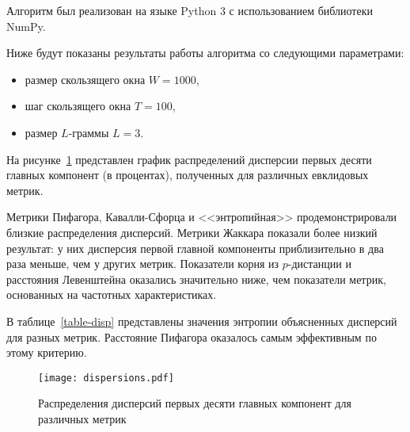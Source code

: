 Алгоритм был реализован на языке Python 3 с использованием библиотеки NumPy.

Ниже будут показаны результаты работы алгоритма со следующими параметрами:
\begin{itemize}
  \item размер скользящего окна $W = 1000$,
  \item шаг скользящего окна $T = 100$,
  \item размер $L$-граммы $L = 3$.
\end{itemize}

На рисунке~\ref{dispersions} представлен график распределений дисперсии первых десяти главных компонент (в процентах), полученных для различных евклидовых метрик.

Метрики Пифагора, Кавалли-Сфорца и <<энтропийная>> продемонстрировали близкие распределения дисперсий. Метрики Жаккара показали более низкий результат: у них дисперсия первой главной компоненты приблизительно в два раза меньше, чем у других метрик. Показатели корня из $p$-дистанции и расстояния Левенштейна оказались значительно ниже, чем показатели метрик, основанных на частотных характеристиках.

В таблице~\ref{table-disp} представлены значения энтропии объясненных дисперсий для разных метрик. Расстояние Пифагора оказалось самым эффективным по этому критерию.

\begin{figure}[h]
  \centering
  \texttt{[image: dispersions.pdf]}
  \caption{Распределения дисперсий первых десяти главных компонент для различных метрик}
  \label{dispersions}
\end{figure}

\begin{table}[h]
  \caption{Энтропия распределения дисперсий главных компонент для различных евклидовых метрик}
  \label{table-disp}
\end{table}

